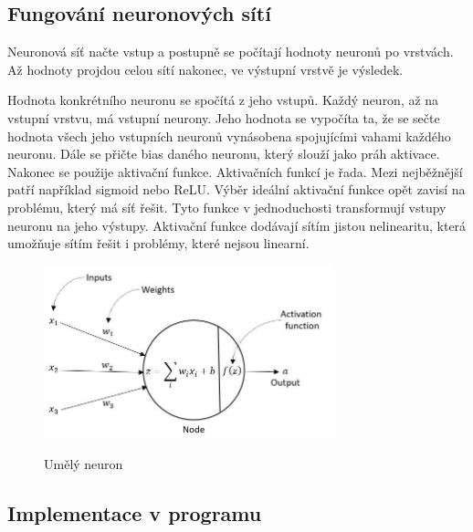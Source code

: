 \subsection{Fungování neuronových sítí}
Neuronová síť načte vstup a postupně se počítají hodnoty neuronů po vrstvách.
Až hodnoty projdou celou sítí nakonec, ve výstupní vrstvě je výsledek.

Hodnota konkrétního neuronu se spočítá z jeho vstupů. Každý neuron, až na vstupní vrstvu, má vstupní neurony.
Jeho hodnota se vypočíta ta, že se sečte hodnota všech jeho vstupních neuronů vynásobena spojujícími vahami každého neuronu.
Dále se přičte bias daného neuronu, který slouží jako práh aktivace. Nakonec se použije aktivační funkce.
Aktivačních funkcí je řada. Mezi nejběžnější patří například sigmoid nebo ReLU. Výběr ideální aktivační funkce opět zavisí na problému, který má síť řešit.
Tyto funkce v jednoduchosti transformují vstupy neuronu na jeho výstupy.
Aktivační funkce dodávají sítím jistou nelinearitu, která umožňuje sítím řešit i problémy, které nejsou linearní.

\begin{figure}[h]
    \centering
    \includegraphics[width=0.75\textwidth]{images/neuron.jpg}
    \caption{Umělý neuron}\cite{umely_neuron}
\end{figure}

\subsection{Implementace v programu}



